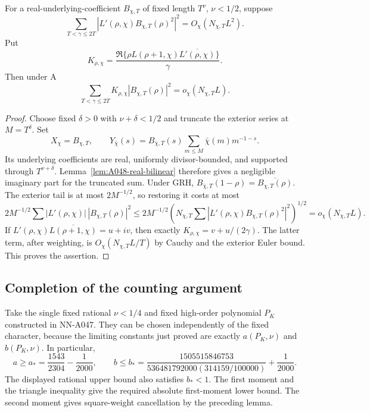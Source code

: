 \begin{lemma}
\label{lem:A048-square-signed}
For a real-underlying-coefficient \(B_{\chi,T}\) of
fixed length \(T^\nu\), \(\nu<1/2\), suppose
\[
 \sum_{T<\gamma\le2T}
       |L'(\rho,\chi)B_{\chi,T}(\rho)^2|^2
                              =O_\chi(N_{\chi,T}L^2).
\]
Put
\[
 K_{\rho,\chi}
  =\frac{\Re\{\rho L(\rho+1,\chi)
                         \overline{L'(\rho,\chi)}\}}{\gamma}.
\]
Then under A
\[
 \sum_{T<\gamma\le2T}
       K_{\rho,\chi}|B_{\chi,T}(\rho)|^2
                                    =o_\chi(N_{\chi,T}L).
\]
\end{lemma}

\begin{proof}
Choose fixed \(\delta>0\) with \(\nu+\delta<1/2\)
and truncate the exterior series at \(M=T^\delta\).
Set
\[
 X_\chi=B_{\chi,T},\qquad
 Y_{\bar\chi}(s)=B_{\bar\chi,T}(s)
                  \sum_{m\le M}\bar\chi(m)m^{-1-s}.
\]
Its underlying coefficients are real, uniformly
divisor-bounded, and supported through \(T^{\nu+\delta}\).
Lemma~\ref{lem:A048-real-bilinear} therefore gives
a negligible imaginary part for the truncated sum.
Under GRH,
\(B_{\bar\chi,T}(1-\rho)=\overline{B_{\chi,T}(\rho)}\).
The exterior tail is at most \(2M^{-1/2}\), so restoring
it costs at most
\[
 2M^{-1/2}\sum |L'(\rho,\chi)|\,|B_{\chi,T}(\rho)|^2
 \le2M^{-1/2}
     \left(N_{\chi,T}\sum|L'(\rho,\chi)B_{\chi,T}(\rho)^2|^2\right)^{1/2}
                   =o_\chi(N_{\chi,T}L).
\]
If \(L'(\rho,\chi)\overline{L(\rho+1,\chi)}=u+iv\),
then exactly \(K_{\rho,\chi}=v+u/(2\gamma)\).
The latter term, after weighting, is
\(O_\chi(N_{\chi,T}L/T)\) by Cauchy and the exterior
Euler bound. This proves the assertion.
\end{proof}

\subsection*{Completion of the counting argument}

Take the single fixed rational \(\nu<1/4\) and fixed
high-order polynomial \(P_K\) constructed in NN-A047.
They can be chosen independently of the fixed character,
because the limiting constants just proved are exactly
\(a(P_K,\nu)\) and \(b(P_K,\nu)\). In particular,
\[
 a\ge a_*=\frac{1543}{2304}-\frac1{2000},\qquad
 b\le b_*=
 \frac{1505515846753}
      {536481792000(314159/100000)}+\frac1{2000}.
\]
The displayed rational upper bound also satisfies \(b_*<1\).
The first moment and the triangle inequality give the
required absolute first-moment lower bound. The second
moment gives square-weight cancellation by the preceding
lemma.

